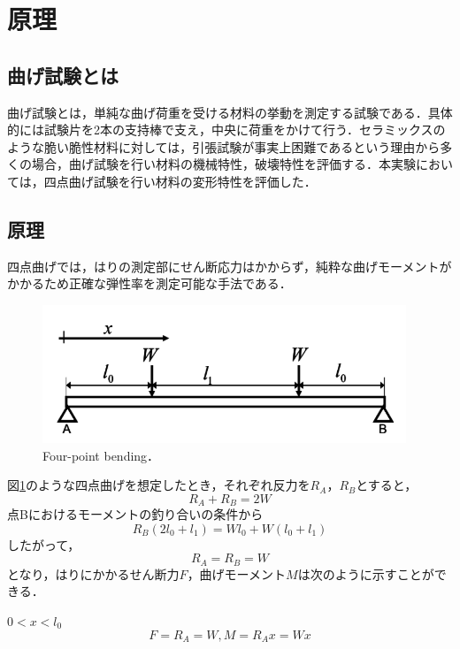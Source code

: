 \section{原理}

\subsection{曲げ試験とは}
曲げ試験とは，単純な曲げ荷重を受ける材料の挙動を測定する試験である．具体的には試験片を2本の支持棒で支え，中央に荷重をかけて行う．セラミックスのような脆い脆性材料に対しては，引張試験が事実上困難であるという理由から多くの場合，曲げ試験を行い材料の機械特性，破壊特性を評価する．本実験においては，四点曲げ試験を行い材料の変形特性を評価した．

\subsection{原理}
四点曲げでは，はりの測定部にせん断応力はかからず，純粋な曲げモーメントがかかるため正確な弾性率を測定可能な手法である．
\begin{figure}[htbp]
    \centering %
    \includegraphics[width=100truemm,clip]{fig/fig_四点曲げ試験}
    \caption{Four-point bending．}
    \label{fig:fig_四点曲げ試験}
\end{figure}
図\ref{fig:fig_四点曲げ試験}のような四点曲げを想定したとき，それぞれ反力を$R_A$，$R_B$とすると，
\begin{equation}
    R_A + R_B = 2W
\end{equation}
点Bにおけるモーメントの釣り合いの条件から
\begin{equation}
    R_B(2l_0 + l_1) = Wl_0 + W(l_0 + l_1)
\end{equation}
したがって，
\begin{equation}
    R_A = R_B = W
\end{equation}
となり，はりにかかるせん断力$F$，曲げモーメント$M$は次のように示すことができる．

$0<x<l_0$
\begin{equation}
    F = R_A =W, M = R_Ax = Wx
\end{equation}

